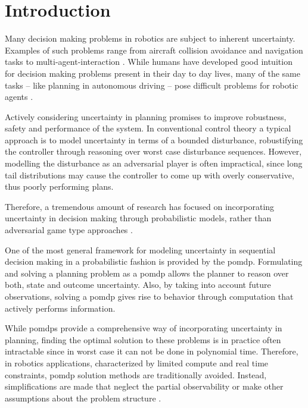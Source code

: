 \chapter{Introduction}\label{chap:introduction}

Many decision making problems in robotics are subject to inherent uncertainty.
Examples of such problems range from aircraft collision avoidance and
navigation tasks to multi-agent-interaction
\cite{kochenderfer2012next}. While humans have developed good
intuition for decision making problems present in their day to day lives, many
of the same tasks -- like planning in autonomous driving -- pose difficult
problems for robotic agents \cite{levinson2011towards}.

Actively considering uncertainty in planning promises to improve robustness,
safety and performance of the system. In conventional control theory a typical approach is to model uncertainty in terms
of a bounded disturbance, robustifying the controller through reasoning over
worst case disturbance sequences. However, modelling the disturbance as an
adversarial player is often impractical, since long tail distributions may
cause the controller to come up with overly conservative, thus poorly
performing plans.

Therefore, a tremendous amount of research has focused on incorporating
uncertainty in decision making through probabilistic models, rather than
adversarial game type approaches \cite{roy1999coastal, amato2015planning,
fisac2018probabilistically, choudhury2019dynamic}.

 One of the most
general framework for modeling uncertainty in sequential decision making in
a probabilistic fashion is provided by the \ac{pomdp}. Formulating and solving
a planning problem as a \ac{pomdp} allows the planner to reason over both,
state and outcome uncertainty. Also, by taking into account future
observations, solving a \ac{pomdp} gives rise to behavior through computation
that actively performs information.

While \acp{pomdp} provide a comprehensive way of incorporating uncertainty in
planning, finding the optimal solution to these problems is in practice often
intractable since in worst case it can not be done in polynomial time. Therefore, in robotics applications, characterized by limited compute
and real time constraints, \ac{pomdp} solution methods are traditionally
avoided. Instead, simplifications are made that neglect the partial
observability or make other assumptions about the problem structure
\cite{sadigh2016information, fisac2018probabilistically}.

